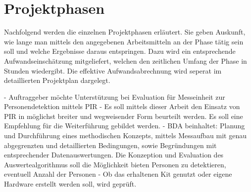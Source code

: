 \section{Projektphasen}

Nachfolgend werden die einzelnen Projektphasen erläutert. Sie geben Auskunft, wie lange man mittels den angegebenen Arbeitsmitteln an der Phase tätig sein soll und welche Ergebnisse daraus entspringen. Dazu wird ein entsprechende Aufwandseinschätzung mitgeliefert, welchen den zeitlichen Umfang der Phase in Stunden wiedergibt. Die effektive Aufwandsabrechnung wird seperat im detaillierten Projektplan dargelegt. 

-	Auftraggeber möchte Unterstützung bei Evaluation für Messeinheit zur Personendetektion mittels PIR
-	Es soll mittels dieser Arbeit den Einsatz von PIR in möglichst breiter und wegweisender Form beurteilt werden. Es soll eine Empfehlung für die Weiterführung gebildet werden.
-	BDA beinhaltet: Planung und Durchführung eines methodischen Konzepts, mittels Messaufbau mit genau abgegrenzten und detaillierten Bedingungen, sowie   Begründungen mit entsprechender Datenauswertungen. Die Konzeption und Evaluation des Auswertealgorithmus soll die Möglichkeit bieten Personen zu detektieren, eventuell Anzahl der Personen
-	Ob das erhaltenen Kit genutzt oder eigene Hardware erstellt werden soll, wird geprüft.


